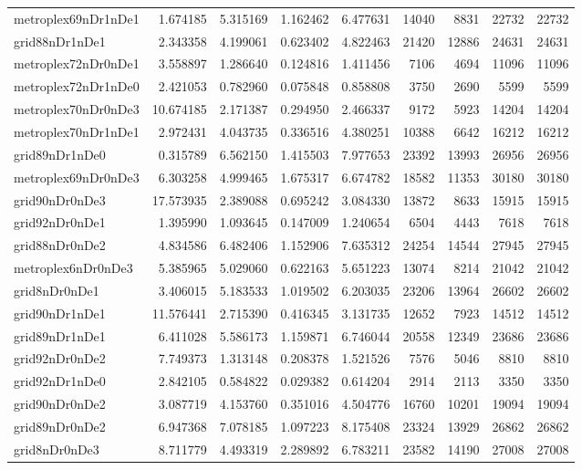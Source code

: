 \begin{longtable}{|l|r|r|r|r|r|r|r|r|}
metroplex69nDr1nDe1 & 1.674185 & 5.315169 & 1.162462 & 6.477631 & 14040 & 8831 & 22732 & 22732 \\
grid88nDr1nDe1 & 2.343358 & 4.199061 & 0.623402 & 4.822463 & 21420 & 12886 & 24631 & 24631 \\
metroplex72nDr0nDe1 & 3.558897 & 1.286640 & 0.124816 & 1.411456 & 7106 & 4694 & 11096 & 11096 \\
metroplex72nDr1nDe0 & 2.421053 & 0.782960 & 0.075848 & 0.858808 & 3750 & 2690 & 5599 & 5599 \\
metroplex70nDr0nDe3 & 10.674185 & 2.171387 & 0.294950 & 2.466337 & 9172 & 5923 & 14204 & 14204 \\
metroplex70nDr1nDe1 & 2.972431 & 4.043735 & 0.336516 & 4.380251 & 10388 & 6642 & 16212 & 16212 \\
grid89nDr1nDe0 & 0.315789 & 6.562150 & 1.415503 & 7.977653 & 23392 & 13993 & 26956 & 26956 \\
metroplex69nDr0nDe3 & 6.303258 & 4.999465 & 1.675317 & 6.674782 & 18582 & 11353 & 30180 & 30180 \\
grid90nDr0nDe3 & 17.573935 & 2.389088 & 0.695242 & 3.084330 & 13872 & 8633 & 15915 & 15915 \\
grid92nDr0nDe1 & 1.395990 & 1.093645 & 0.147009 & 1.240654 & 6504 & 4443 & 7618 & 7618 \\
grid88nDr0nDe2 & 4.834586 & 6.482406 & 1.152906 & 7.635312 & 24254 & 14544 & 27945 & 27945 \\
metroplex6nDr0nDe3 & 5.385965 & 5.029060 & 0.622163 & 5.651223 & 13074 & 8214 & 21042 & 21042 \\
grid8nDr0nDe1 & 3.406015 & 5.183533 & 1.019502 & 6.203035 & 23206 & 13964 & 26602 & 26602 \\
grid90nDr1nDe1 & 11.576441 & 2.715390 & 0.416345 & 3.131735 & 12652 & 7923 & 14512 & 14512 \\
grid89nDr1nDe1 & 6.411028 & 5.586173 & 1.159871 & 6.746044 & 20558 & 12349 & 23686 & 23686 \\
grid92nDr0nDe2 & 7.749373 & 1.313148 & 0.208378 & 1.521526 & 7576 & 5046 & 8810 & 8810 \\
grid92nDr1nDe0 & 2.842105 & 0.584822 & 0.029382 & 0.614204 & 2914 & 2113 & 3350 & 3350 \\
grid90nDr0nDe2 & 3.087719 & 4.153760 & 0.351016 & 4.504776 & 16760 & 10201 & 19094 & 19094 \\
grid89nDr0nDe2 & 6.947368 & 7.078185 & 1.097223 & 8.175408 & 23324 & 13929 & 26862 & 26862 \\
grid8nDr0nDe3 & 8.711779 & 4.493319 & 2.289892 & 6.783211 & 23582 & 14190 & 27008 & 27008 \\

\end{longtable}
